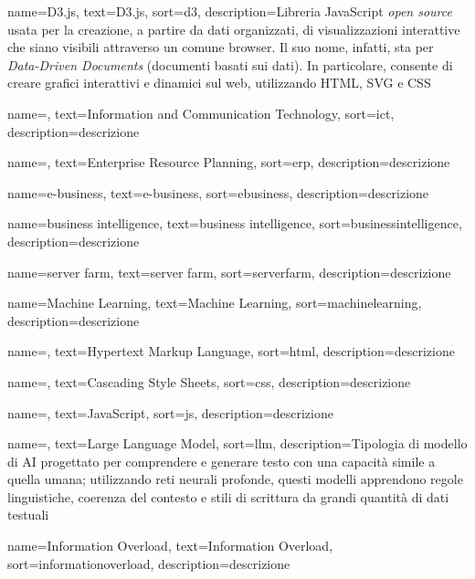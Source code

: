  {
    name=D3.js,
    text=D3.js,
    sort=d3,
    description={Libreria JavaScript \emph{open source} usata per la creazione, a partire da dati organizzati, di visualizzazioni interattive che siano visibili attraverso un comune browser.
    Il suo nome, infatti, sta per \emph{Data-Driven Documents} (documenti basati sui dati). 
    In particolare, consente di creare grafici interattivi e dinamici sul web, utilizzando HTML, SVG e CSS}
}

 {
    name=,
    text=Information and Communication Technology,
    sort=ict,
    description={descrizione}
}

 {
    name=,
    text=Enterprise Resource Planning,
    sort=erp,
    description={descrizione}
}

 {
    name=e-business,
    text=e-business,
    sort=ebusiness,
    description={descrizione}
}

 {
    name=business intelligence,
    text=business intelligence,
    sort=businessintelligence,
    description={descrizione}
}

 {
    name=server farm,
    text=server farm,
    sort=serverfarm,
    description={descrizione}
}

 {
    name=Machine Learning,
    text=Machine Learning,
    sort=machinelearning,
    description={descrizione}
}

 {
    name=,
    text=Hypertext Markup Language,
    sort=html,
    description={descrizione}
}

 {
    name=,
    text=Cascading Style Sheets,
    sort=css,
    description={descrizione}
}

 {
    name=,
    text=JavaScript,
    sort=js,
    description={descrizione}
}

 {
    name=,
    text=Large Language Model,
    sort=llm,
    description={Tipologia di modello di AI progettato per comprendere e
    generare testo con una capacità simile a quella umana; utilizzando reti neurali
    profonde, questi modelli apprendono regole linguistiche, coerenza del contesto e
    stili di scrittura da grandi quantità di dati testuali}
}

 {
    name=Information Overload,
    text=Information Overload,
    sort=informationoverload,
    description={descrizione}
}

